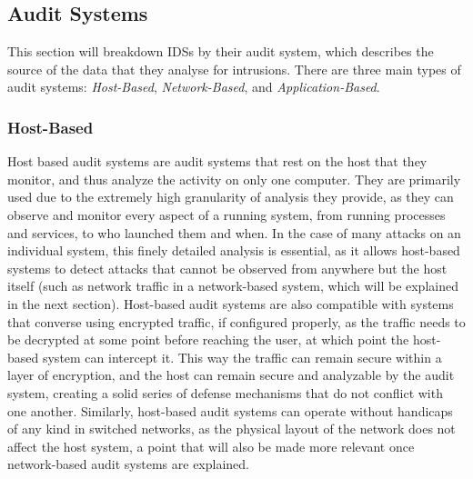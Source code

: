 \documentclass{acm_proc_article-sp}
\begin{document}
    \subsection{Audit Systems}
    	This section will breakdown IDSs by their audit system, which describes the source of the data that they analyse for intrusions. There are three main types of audit systems: \emph{Host-Based}, \emph{Network-Based}, and \emph{Application-Based}.
    	\subsubsection{Host-Based} %
    Host based audit systems are audit systems that rest on the host that they monitor, and thus analyze the activity on only one computer. They are primarily used due to the extremely high granularity of analysis they provide, as they can observe and monitor every aspect of a running system, from running processes and services, to who launched them and when. In the case of many attacks on an individual system, this finely detailed analysis is essential, as it allows host-based systems to detect attacks that cannot be observed from anywhere but the host itself (such as network traffic in a network-based system, which will be explained in the next section). Host-based audit systems are also compatible with systems that converse using encrypted traffic, if configured properly, as the traffic needs to be decrypted at some point before reaching the user, at which point the host-based system can intercept it. This way the traffic can remain secure within a layer of encryption, and the host can remain secure and analyzable by the audit system, creating a solid series of defense mechanisms that do not conflict with one another. Similarly, host-based audit systems can operate without handicaps of any kind in switched networks, as the physical layout of the network does not affect the host system, a point that will also be made more relevant once network-based audit systems are explained. 
    
\end{document}
